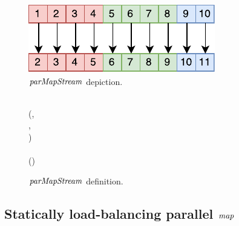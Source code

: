 \documentclass[paper=A4,twoside=true,openright,parskip=full,chapterprefix=true,headings=normal,bibliography=totoc,listof=totoc,titlepage=on,captions=tableabove,draft=false,british]{scrreprt}%
\begin{document}
\begin{figure}[h]
\centering
\includegraphics{src/img/parMapStream.pdf}
\caption{\ensuremath{\Varid{parMapStream}} depiction.\label{fig:parMapStreamImg}}
\end{figure}

\begin{figure}[h]
\centering
\begin{hscode}\SaveRestoreHook
{}%
%
%
\>[B]{}\;\mathrel{=}\<[E]%
\\[\blanklineskip]%
\>[B]{}\mathbin{::}(\;\;\;\;,{}\<[E]%
\\
\>[B]{}\<[5]%
\>[5]{}\;,{}\<[E]%
\\
\>[B]{}\<[5]%
\>[5]{}\;)\Rightarrow {}\<[E]%
\\
\>[B]{}\<[5]%
\>[5]{}\to {}\to {}\;\;\to {}\<[E]%
\\
\>[B]{}\;\;\;\mathrel{=}\;\;\;(\;){}\<[E]%
\ColumnHook
\end{hscode}\resethooks
\caption{\ensuremath{\Varid{parMapStream}} definition.}\label{fig:parMapStream}\end{figure}

\hypertarget{statically-load-balancing-parallel-map}{%
\subsection{\texorpdfstring{Statically load-balancing parallel
\ensuremath{\Varid{map}}}{Statically load-balancing parallel }}\label{statically-load-balancing-parallel-map}}

\label{sec:staticallyloadbalancing}
\end{document}
